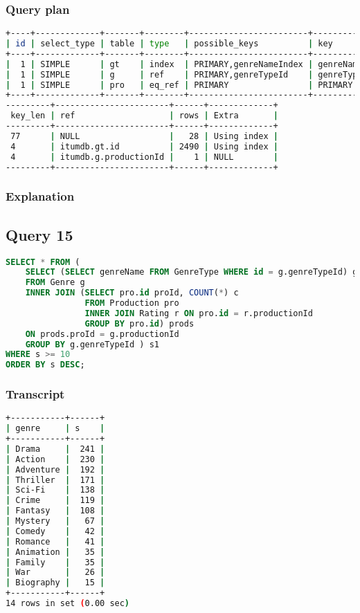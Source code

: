 \subsubsection{Query plan}
\begin{lstlisting}[language=bash]
+----+-------------+-------+--------+------------------------+----------------+
| id | select_type | table | type   | possible_keys          | key            |
+----+-------------+-------+--------+------------------------+----------------+
|  1 | SIMPLE      | gt    | index  | PRIMARY,genreNameIndex | genreNameIndex |
|  1 | SIMPLE      | g     | ref    | PRIMARY,genreTypeId    | genreTypeId    |
|  1 | SIMPLE      | pro   | eq_ref | PRIMARY                | PRIMARY        |
+----+-------------+-------+--------+------------------------+----------------+
---------+-----------------------+------+-------------+
 key_len | ref                   | rows | Extra       |
---------+-----------------------+------+-------------+
 77      | NULL                  |   28 | Using index |
 4       | itumdb.gt.id          | 2490 | Using index |
 4       | itumdb.g.productionId |    1 | NULL        |
---------+-----------------------+------+-------------+
\end{lstlisting}

\subsubsection{Explanation}


\subsection{Query 15}
\begin{lstlisting}[language=sql]
SELECT * FROM (
	SELECT (SELECT genreName FROM GenreType WHERE id = g.genreTypeId) genre, SUM(prods.c) s
	FROM Genre g
	INNER JOIN (SELECT pro.id proId, COUNT(*) c
				FROM Production pro
				INNER JOIN Rating r ON pro.id = r.productionId
				GROUP BY pro.id) prods
	ON prods.proId = g.productionId
	GROUP BY g.genreTypeId ) s1
WHERE s >= 10
ORDER BY s DESC;
\end{lstlisting}

\subsubsection{Transcript}
\begin{lstlisting}[language=bash]
+-----------+------+
| genre     | s    |
+-----------+------+
| Drama     |  241 |
| Action    |  230 |
| Adventure |  192 |
| Thriller  |  171 |
| Sci-Fi    |  138 |
| Crime     |  119 |
| Fantasy   |  108 |
| Mystery   |   67 |
| Comedy    |   42 |
| Romance   |   41 |
| Animation |   35 |
| Family    |   35 |
| War       |   26 |
| Biography |   15 |
+-----------+------+
14 rows in set (0.00 sec)
\end{lstlisting}

